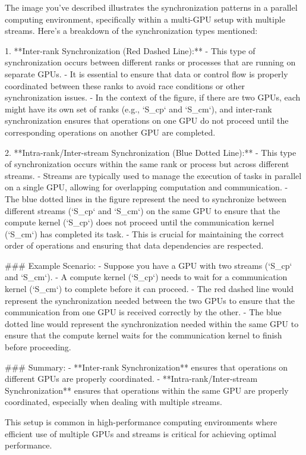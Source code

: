 The image you've described illustrates the synchronization patterns in a parallel computing environment, specifically within a multi-GPU setup with multiple streams. Here's a breakdown of the synchronization types mentioned:

1. **Inter-rank Synchronization (Red Dashed Line):**
   - This type of synchronization occurs between different ranks or processes that are running on separate GPUs.
   - It is essential to ensure that data or control flow is properly coordinated between these ranks to avoid race conditions or other synchronization issues.
   - In the context of the figure, if there are two GPUs, each might have its own set of ranks (e.g., `S_{cp}` and `S_{cm}`), and inter-rank synchronization ensures that operations on one GPU do not proceed until the corresponding operations on another GPU are completed.

2. **Intra-rank/Inter-stream Synchronization (Blue Dotted Line):**
   - This type of synchronization occurs within the same rank or process but across different streams.
   - Streams are typically used to manage the execution of tasks in parallel on a single GPU, allowing for overlapping computation and communication.
   - The blue dotted lines in the figure represent the need to synchronize between different streams (`S_{cp}` and `S_{cm}`) on the same GPU to ensure that the compute kernel (`S_{cp}`) does not proceed until the communication kernel (`S_{cm}`) has completed its task.
   - This is crucial for maintaining the correct order of operations and ensuring that data dependencies are respected.

### Example Scenario:
- Suppose you have a GPU with two streams (`S_{cp}` and `S_{cm}`).
- A compute kernel (`S_{cp}`) needs to wait for a communication kernel (`S_{cm}`) to complete before it can proceed.
- The red dashed line would represent the synchronization needed between the two GPUs to ensure that the communication from one GPU is received correctly by the other.
- The blue dotted line would represent the synchronization needed within the same GPU to ensure that the compute kernel waits for the communication kernel to finish before proceeding.

### Summary:
- **Inter-rank Synchronization** ensures that operations on different GPUs are properly coordinated.
- **Intra-rank/Inter-stream Synchronization** ensures that operations within the same GPU are properly coordinated, especially when dealing with multiple streams.

This setup is common in high-performance computing environments where efficient use of multiple GPUs and streams is critical for achieving optimal performance.